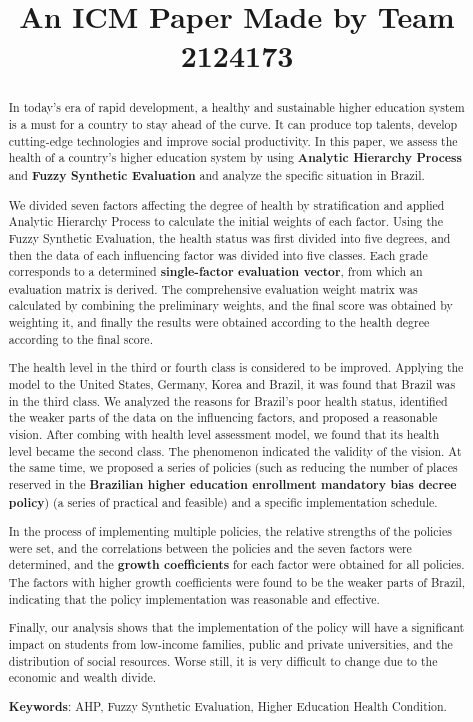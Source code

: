 \documentclass[12pt]{article}  %
\title{An ICM Paper Made by Team 2124173}  %
\begin{document}
	
\begin{abstract}
In today's era of rapid development, a healthy and sustainable higher education system 
is a must for a country to stay ahead of the curve. It can produce top talents, develop 
cutting-edge technologies and improve social productivity. In this paper, we assess the
 health of a country's higher education system by using \textbf{Analytic Hierarchy Process}
  and \textbf{Fuzzy Synthetic Evaluation} and analyze the specific situation in Brazil.

We divided seven factors affecting the degree of health by stratification and applied Analytic Hierarchy Process 
to calculate the initial weights of each factor. Using the Fuzzy Synthetic Evaluation, the health status was first 
divided into five degrees, and then the data of each influencing factor was divided into five classes. Each grade 
corresponds to a determined \textbf{single-factor evaluation vector}, from which an evaluation matrix is derived. 
The comprehensive evaluation weight matrix was calculated by combining the preliminary weights, and the final score 
was obtained by weighting it, and finally the results were obtained according to the health degree according to the 
final score.

The health level in the third or fourth class is considered to be improved. Applying the model to the United States, 
Germany, Korea and Brazil, it was found that Brazil was in the third class. We analyzed the reasons for Brazil's poor 
health status, identified the weaker parts of the data on the influencing factors, and proposed a reasonable vision. 
After combing with health level assessment model, we found that its health level became the second class. The phenomenon 
indicated the validity of the vision. At the same time, we proposed a series of policies (such as reducing the number of 
places reserved in the \textbf{Brazilian higher education enrollment mandatory bias decree policy}) (a series of practical 
and feasible) and a specific implementation schedule.

In the process of implementing multiple policies, the relative strengths of the policies were set, and the correlations 
between the policies and the seven factors were determined, and the \textbf{growth coefficients} for each factor were 
obtained for all policies. The factors with higher growth coefficients were found to be the weaker parts of Brazil, 
indicating that the policy implementation was reasonable and effective. 

Finally, our analysis shows that the implementation of the policy will have a significant impact on students from 
low-income families, public and private universities, and the distribution of social resources. Worse still, it is 
very difficult to change due to the economic and wealth divide.



\vspace{5pt}
\textbf{Keywords}: AHP,  Fuzzy Synthetic Evaluation, Higher Education Health Condition.

\end{abstract}
\end{document}
